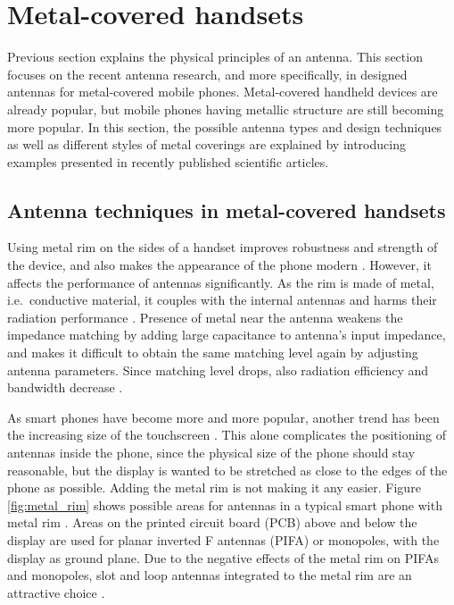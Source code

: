 \section{Metal-covered handsets}
\label{sec:metal_cover}
Previous section explains the physical principles of an antenna. This section focuses on the recent antenna research, and more specifically, in designed antennas for metal-covered mobile phones. Metal-covered handheld devices are already popular, but mobile phones having metallic structure are still becoming more popular. In this section, the possible antenna types and design techniques as well as different styles of metal coverings are explained by introducing examples presented in recently published scientific articles.

\subsection{Antenna techniques in metal-covered handsets}
\label{sec:metal_rim}
Using metal rim on the sides of a handset improves robustness and strength of the device, and also makes the appearance of the phone modern \cite{ban_dual_loop, hsu_compact, yuan_slot}. However, it affects the performance of antennas significantly. As the rim is made of metal, i.e.\ conductive material, it couples with the internal antennas and harms their radiation performance \cite{ban_dual_loop}. Presence of metal near the antenna weakens the impedance matching by adding large capacitance to antenna's input impedance, and makes it difficult to obtain the same matching level again by adjusting antenna parameters. Since matching level drops, also radiation efficiency and bandwidth decrease \cite{ban_dual_loop, hsu_compact, yuan_slot}.

As smart phones have become more and more popular, another trend has been the increasing size of the touchscreen \cite{ban_low_profile}. This alone complicates the positioning of antennas inside the phone, since the physical size of the phone should stay reasonable, but the display is wanted to be stretched as close to the edges of the phone as possible. Adding the metal rim is not making it any easier. Figure \ref{fig:metal_rim} shows possible areas for antennas in a typical smart phone with metal rim \cite{hsu_compact}. Areas on the printed circuit board (PCB) above and below the display are used for planar inverted F antennas (PIFA) or monopoles, with the display as ground plane. Due to the negative effects of the metal rim on PIFAs and monopoles, slot and loop antennas integrated to the metal rim are an attractive choice \cite{hsu_compact, ban_dual_loop}.

